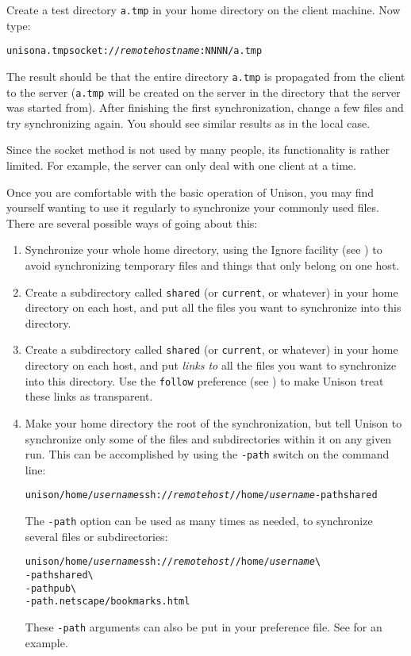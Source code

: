 \documentclass{article}
\newcommand{\NT}[1]{\textit{#1}}
\begin{document}
Create a test directory {\tt a.tmp} in your home directory on the
client machine.  Now type:
\begin{alltt}
       unison a.tmp socket://\NT{remotehostname}:NNNN/a.tmp
\end{alltt}
The result should be that the entire directory {\tt a.tmp} is
propagated from the client to the server (\texttt{a.tmp} will be
created on the server in the directory that the server was started
from).
%
After finishing the first synchronization, change a few files and try
synchronizing again.  You should see similar results as in the local
case.

Since the socket method is not used by many people, its functionality is
rather limited.  For example, the server can only deal with one client at a
time. 



Once you are comfortable with the basic operation of Unison, you may
find yourself wanting to use it regularly to synchronize your commonly
used files.  There are several possible ways of going about this:

\begin{enumerate}
\item Synchronize your whole home directory, using the Ignore facility
(see )
to avoid synchronizing temporary files and things that only belong on
one host.
\item Create a subdirectory called {\tt shared} (or {\tt current}, or
whatever) in your home directory on each host, and put all the files
you want to synchronize into this directory.  
\item Create a subdirectory called {\tt shared} (or {\tt current}, or
whatever) in your home directory on each host, and put {\em links to}
all the files you want to synchronize into this directory.  Use the
{\tt follow} preference (see ) to make
Unison treat these links as transparent.
\item Make your home directory the root of the synchronization, but
tell Unison to synchronize only some of the files and subdirectories
within it on any given run.  This can be accomplished by using the {\tt -path} switch
on the command line:
\begin{alltt}
       unison /home/\NT{username} ssh://\NT{remotehost}//home/\NT{username} -path shared
\end{alltt}
The {\tt -path} option can be used as many times as needed, to 
synchronize several files or subdirectories:
\begin{alltt}
       unison /home/\NT{username} ssh://\NT{remotehost}//home/\NT{username} \verb|\|
          -path shared \verb|\|
          -path pub \verb|\|
          -path .netscape/bookmarks.html
\end{alltt}
These \verb|-path| arguments can also be put in your preference file.
See  for an example.
\end{enumerate}
\end{document}
